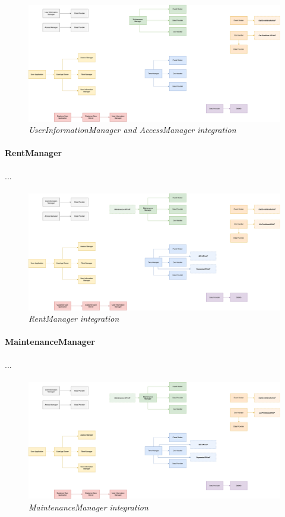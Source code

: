 		\begin{figure}[h]
			\centering
			\includegraphics[width=0.6\linewidth]{img/Integration2b}
			\caption{
				\label{fig:userInfoAccessManager} 
				\emph{UserInformationManager and AccessManager integration}
			}
		\end{figure}
		
\paragraph{RentManager} 
...
\paragraph{}
		
		\begin{figure}[h]
			\centering
			\includegraphics[width=0.8\linewidth]{img/Integration3a}
			\caption{
				\label{fig:rentManager} 
				\emph{RentManager integration}
			}
		\end{figure}

\paragraph{MaintenanceManager} 
...
\paragraph{}
		
		\begin{figure}[h]
			\centering
			\includegraphics[width=0.8\linewidth]{img/Integration3b}
			\caption{
				\label{fig:maintenanceManager} 
				\emph{MaintenanceManager integration}
			}
		\end{figure}
		
